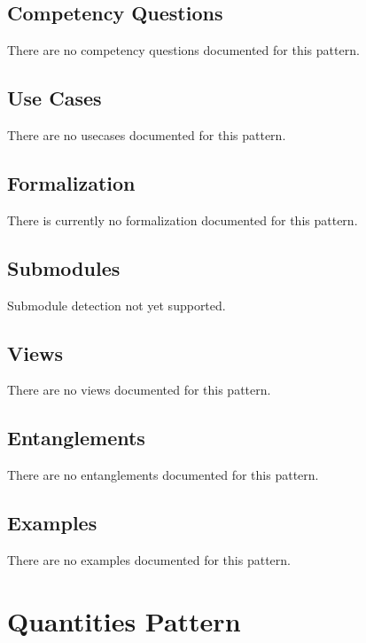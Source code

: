 \subsection{Competency Questions}
\label{ssec:cqs}
There are no competency questions documented for this pattern.

\subsection{Use Cases}
\label{ssec:use-cases}
There are no usecases documented for this pattern.
\subsection{Formalization}
\label{ssec:formalization}
There is currently no formalization documented for this pattern.

\subsection{Submodules}
\label{ssec:submodules}
Submodule detection not yet supported.

\subsection{Views}
\label{ssec:views}
There are no views documented for this pattern.


\subsection{Entanglements}
\label{ssec:entanglements}
There are no entanglements documented for this pattern.

\subsection{Examples}
\label{ssec:examples}
There are no examples documented for this pattern.


\section{Quantities Pattern}
\label{sec:quantities-pattern}
